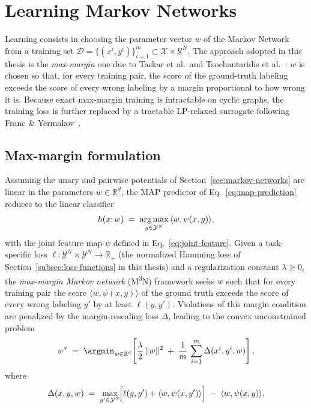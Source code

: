 \section{Learning Markov Networks}
\label{sec:learning-mn}

Learning consists in choosing the parameter vector $w$ of the Markov
Network from a training set
$\mathcal{D} = \{(x^i, y^i)\}_{i=1}^{m} \subset \mathcal{X} \times
\mathcal{Y}^{N}$. The approach adopted in this thesis is the
\emph{max-margin} one due to Taskar et al.\ and Tsochantaridis et
al.~\cite{Taskar2004, Tsochantaridis2005}: $w$ is chosen so that, for
every training pair, the score of the ground-truth labeling exceeds
the score of every wrong labeling by a margin proportional to how
wrong it is. Because exact max-margin training is intractable on
cyclic graphs, the training loss is further replaced by a tractable
LP-relaxed surrogate following Franc \& Yermakov~\cite{franc2021}.

\subsection{Max-margin formulation}
\label{subsec:max-margin}

Assuming the unary and pairwise potentials of
Section~\ref{sec:markov-networks} are linear in the parameters
$w \in \mathbb{R}^{d}$, the MAP predictor of
Eq.~\eqref{eq:map-prediction} reduces to the linear classifier
\begin{equation}
    h(x; w) \;=\; \operatorname*{arg\,max}_{y \in \mathcal{Y}^{N}}\,
    \langle w, \psi(x, y) \rangle,
    \label{eq:linear-classifier}
\end{equation}
with the joint feature map $\psi$ defined in
Eq.~\eqref{eq:joint-feature}. Given a task-specific loss
$\ell \colon \mathcal{Y}^{N} \times \mathcal{Y}^{N} \to \mathbb{R}_{+}$
(the normalized Hamming loss of
Section~\ref{subsec:loss-functions} in this thesis) and a
regularization constant $\lambda \geq 0$, the
\emph{max-margin Markov network} (M\textsuperscript{3}N) framework
seeks $w$ such that for every training pair the score
$\langle w, \psi(x, y)\rangle$ of the ground truth exceeds the
score of every wrong labeling $y'$ by at least $\ell(y, y')$.
Violations of this margin condition are penalized by the
margin-rescaling loss $\Delta$, leading to the convex unconstrained
problem
\begin{equation}
    w^{*} \;=\; \argmin_{w \in \mathbb{R}^d}\!\left[
    \frac{\lambda}{2}\, \|w\|^{2}
    \;+\; \frac{1}{m}\, \sum_{i=1}^{m}
    \Delta(x^i, y^i, w)
    \right],
    \label{eq:m3n-objective}
\end{equation}
where
\begin{equation}
    \Delta(x, y, w) \;=\;
    \max_{y' \in \mathcal{Y}^{N}}\!
    \Bigl[
        \ell(y, y') + \langle w, \psi(x, y') \rangle
    \Bigr]
    \;-\; \langle w, \psi(x, y) \rangle.
    \label{eq:margin-rescaling}
\end{equation}

